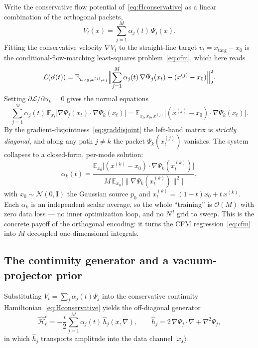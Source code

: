 \documentclass[11pt, a4paper]{article}
\newcommand{\Hgen}{\hat{\mathcal{H}}}
\newcommand{\Eblr}{\mathbb{E}}
\begin{document}
Write the conservative flow potential of~\eqref{eq:Hconservative} as a linear
combination of the orthogonal packets,
\begin{equation}
  V_t(x)=\sum_{j=1}^M\alpha_j(t)\,\Psi_j(x).
\end{equation}
Fitting the conservative velocity $\nabla V_t$ to the straight-line target
$v_t=x_{\mathrm{targ}}-x_0$ is the conditional-flow-matching least-squares
problem~\eqref{eq:cfm}, which here reads
\begin{equation}
  \mathcal{L}(\vec\alpha(t))=
  \Eblr_{t,x_0,x^{(j)},x_t}\Bigl\|
  \sum_{j=1}^M\alpha_j(t)\,\nabla\Psi_j(x_t)-(x^{(j)}-x_0)\Bigr\|_2^2 .
\end{equation}
Setting $\partial\mathcal{L}/\partial\alpha_k=0$ gives the normal equations
\begin{equation}
  \sum_{j=1}^M\alpha_j(t)\,
  \Eblr_{x_t}\!\bigl[\nabla\Psi_j(x_t)\cdot\nabla\Psi_k(x_t)\bigr]
  =\Eblr_{x_t,x_0,x^{(j)}}\!\bigl[(x^{(j)}-x_0)\cdot\nabla\Psi_k(x_t)\bigr].
\end{equation}
By the gradient-disjointness~\eqref{eq:graddisjoint} the left-hand matrix is
\emph{strictly diagonal}, and along any path $j\neq k$ the packet
$\Psi_k(x_t^{(j)})$ vanishes. The system collapses to a closed-form, per-mode
solution:
\begin{equation}
  \alpha_k(t)=\frac{\Eblr_{x_0}\!\bigl[(x^{(k)}-x_0)\cdot
  \nabla\Psi_k(x_t^{(k)})\bigr]}
  {M\,\Eblr_{x_0}\!\bigl[\|\nabla\Psi_k(x_t^{(k)})\|^2\bigr]},
  \label{eq:alpha}
\end{equation}
with $x_0\sim\mathcal{N}(0,\mathbf{I})$ the Gaussian source $p_0$ and
$x_t^{(k)}=(1-t)x_0+t\,x^{(k)}$. Each $\alpha_k$ is an independent scalar
average, so the whole ``training'' is $\mathcal{O}(M)$ with zero data loss ---
no inner optimization loop, and no $N^d$ grid to sweep. This is the concrete
payoff of the orthogonal encoding: it turns the CFM regression~\eqref{eq:cfm}
into $M$ decoupled one-dimensional integrals.

\subsection{The continuity generator and a vacuum-projector prior}

Substituting $V_t=\sum_j\alpha_j(t)\Psi_j$ into the conservative continuity
Hamiltonian~\eqref{eq:Hconservative} yields the off-diagonal generator
\begin{equation}
  \Hgen_t^c=-\frac{i}{2}\sum_{j=1}^M\alpha_j(t)\,\hat h_j(x,\nabla),\qquad
  \hat h_j=2\,\nabla\Psi_j\cdot\nabla+\nabla^2\Psi_j ,
  \label{eq:Hgen_full}
\end{equation}
in which $\hat h_j$ transports amplitude into the data channel $\ket{x_j}$.
\end{document}
